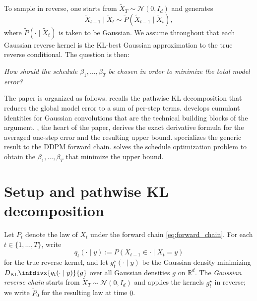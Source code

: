 \documentclass[11pt]{article}
\def\R{\mathbb{R}}
\newcommand{\kl}{D_{\mathrm{KL}}\infdivx}
\begin{document}
To sample in reverse, one starts from \(\widetilde X_T\sim\mathcal N(0,I_d)\) and generates
\[
\widetilde X_{t-1}\mid \widetilde X_t \sim \widetilde P(\widetilde X_{t-1}\mid \widetilde X_t),
\]
where \(\widetilde P(\cdot\mid \widetilde X_t)\) is taken to be Gaussian. We assume throughout that each Gaussian reverse kernel is the KL-best Gaussian approximation to the true reverse conditional. The question is then:

\medskip
\emph{How should the schedule \(\beta_1,\dots,\beta_T\) be chosen in order to minimize the total model error?}
\medskip

The paper is organized as follows.  recalls the pathwise KL decomposition that reduces the global model error to a sum of per-step terms.  develops cumulant identities for Gaussian convolutions that are the technical building blocks of the argument. , the heart of the paper, derives the exact derivative formula for the averaged one-step error and the resulting upper bound.  specializes the generic result to the DDPM forward chain.  solves the schedule optimization problem to obtain the $\beta_1, \ldots, \beta_T$ that minimize the upper bound.

\section{Setup and pathwise KL decomposition}
\label{sec:kl_decomposition}

Let \(P_t\) denote the law of \(X_t\) under the forward chain \eqref{eq:forward_chain}. For each \(t\in\{1,\dots,T\}\), write
\[
q_t(\cdot\mid y) := P(X_{t-1}\in \cdot \mid X_t=y)
\]
for the true reverse kernel, and let \(g_t^\star(\cdot\mid y)\) be the Gaussian density minimizing \(\kl{q_t(\cdot\mid y)}{g}\) over all Gaussian densities \(g\) on \(\R^d\). The \emph{Gaussian reverse chain} starts from \(\widetilde X_T\sim\mathcal N(0,I_d)\) and applies the kernels \(g_t^\star\) in reverse; we write \(\widetilde P_0\) for the resulting law at time \(0\).
\end{document}
